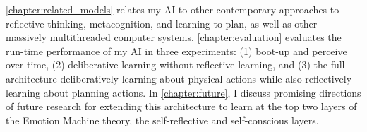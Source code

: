 {\mbox{\autoref{chapter:related_models}}} relates my AI to other
contemporary approaches to reflective thinking, metacognition, and
learning to plan, as well as other massively multithreaded computer
systems.  {\mbox{\autoref{chapter:evaluation}}} evaluates the run-time
performance of my AI in three experiments: (1) boot-up and perceive
over time, (2) deliberative learning without reflective learning, and
(3) the full architecture deliberatively learning about physical
actions while also reflectively learning about planning actions.  In
{\mbox{\autoref{chapter:future}}}, I discuss promising directions of
future research for extending this architecture to learn at the top
two layers of the Emotion Machine theory, the self-reflective and
self-conscious layers.


